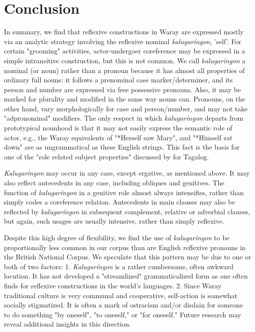 \documentclass[output=paper]{langscibook}
\begin{document}
\section{Conclusion}
\label{sec:Payne:11}

In summary, we find that reflexive constructions in Waray are expressed mostly via an analytic strategy involving the reflexive nominal \textit{kalugaríngon}, 'self'. For certain "grooming" activities, actor-undergoer coreference may be expressed in a simple intransitive construction, but this is not common. We call \textit{kalugaríngon} a nominal (or noun) rather than a pronoun because it has almost all properties of ordinary full nouns: it follows a prenominal case marker/determiner, and its person and number are expressed via free possessive pronouns. Also, it may be marked for plurality and modified in the same way nouns can. Pronouns, on the other hand, vary morphologically for case and person/number, and may not take "adpronominal" modifiers. The only respect in which \textit{kalugaríngon} departs from prototypical nounhood is that it may not easily express the semantic role of actor, e.g., the Waray equivalents of "*Herself saw Mary", and "*Himself sat down" are as ungrammatical as these English strings. This fact is the basis for one of the "role related subject properties" discussed by \citet{Schachter1977} for Tagalog.

\textit{Kalugaríngon} may occur in any case, except ergative, as mentioned above. It may also reflect antecedents in any case, including obliques and genitives. The function of \textit{kalugaríngon} in a genitive role almost always intensifies, rather than simply codes a coreference relation. Antecedents in main clauses may also be reflected by \textit{kalugaríngon} in subsequent complement, relative or adverbial clauses, but again, such usages are usually intensive, rather than simply reflexive.

Despite this high degree of flexibility, we find the use of \textit{kalugaríngon} to be proportionally less common in our corpus than are English reflexive pronouns in the British National Corpus. We speculate that this pattern may be due to one or both of two factors: 1. \textit{Kalugaríngon} is a rather cumbersome, often awkward locution. It has not developed a "streamlined" grammaticalized form as one often finds for reflexive constructions in the world's languages. 2. Since Waray traditional culture is very communal and cooperative, self-action is somewhat socially stigmatized. It is often a mark of ostracism and/or disdain for someone to do something "by oneself", "to oneself," or "for oneself." Future research may reveal additional insights in this direction.
\end{document}
